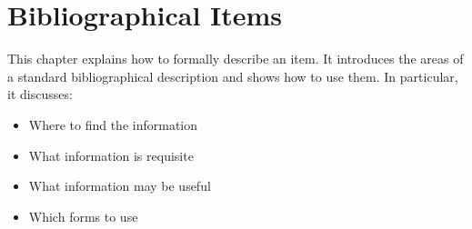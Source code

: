 
\chapter{Bibliographical Items}
\label{cha:bibl}

This chapter explains how to formally describe an item. It introduces
the areas of a standard bibliographical description and shows how to
use them.
In particular, it discusses:
\begin{itemize}
\item Where to find the information
\item What information  is requisite
\item What information may be useful
\item Which forms to use
\end{itemize}



